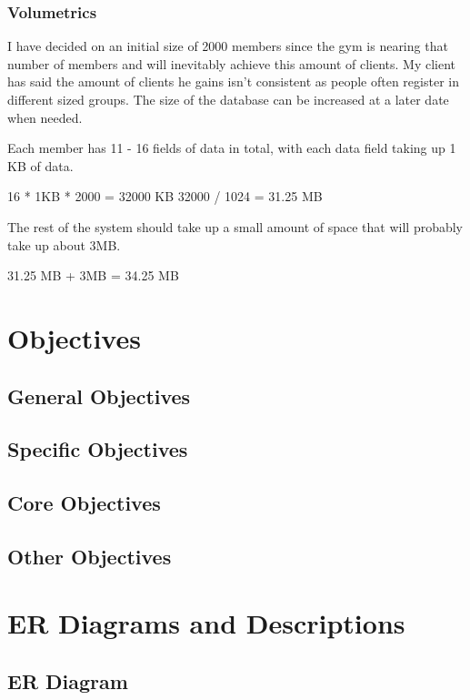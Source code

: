 \subsubsection{Volumetrics}

I have decided on an initial size of 2000 members since the gym is nearing that number of members and will inevitably achieve this amount of clients.  My client has said the amount of clients he gains isn't consistent as people often register in different sized groups. The size of the database can be increased at a later date when needed.  

Each member has 11 - 16 fields of data in total, with each data field taking up 1 KB of data.

16 * 1KB * 2000 = 32000 KB
32000 / 1024 = 31.25 MB

The rest of the system should take up a small amount of space that will probably take up about 3MB.

31.25 MB + 3MB = 34.25 MB

\section{Objectives}



\subsection{General Objectives}

\subsection{Specific Objectives}

\subsection{Core Objectives}

\subsection{Other Objectives}

\section{ER Diagrams and Descriptions}

\subsection{ER Diagram}

